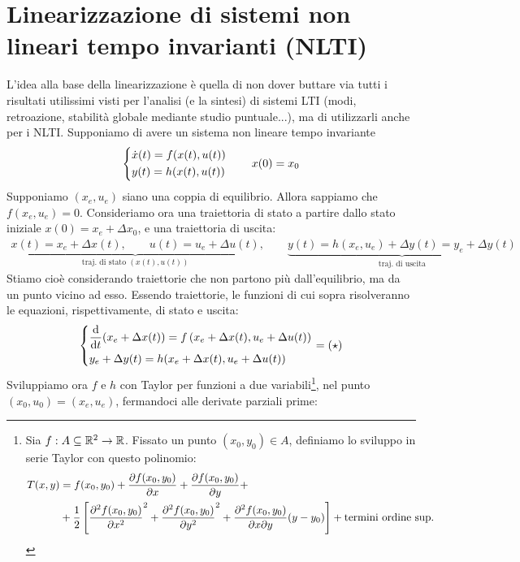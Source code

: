 \documentclass[a4paper]{report}
\begin{document}
\section{Linearizzazione di sistemi non lineari tempo invarianti (NLTI)}
L'idea alla base della linearizzazione è quella di non dover buttare via tutti i risultati utilissimi visti per l'analisi (e la sintesi) di sistemi LTI (modi, retroazione, stabilità globale mediante studio puntuale...), ma di utilizzarli anche per i NLTI.
\bb
	Supponiamo di avere un sistema non lineare tempo invariante$$\begin{dcases}
	\dot x(t) = f(x(t),u(t)) \\
	y(t) = h(x(t), u(t))
\end{dcases}
 \quad \quad x(0) = x_0$$
	Supponiamo $(x_e,u_e)$ siano una coppia di equilibrio. Allora sappiamo che $f(x_e, u_e) = 0$. Consideriamo ora una traiettoria di stato a partire dallo stato iniziale $x(0) = x_e + \Delta x_0$, e una traiettoria di uscita:
\begin{align*}
\underbrace{x(t) = x_e+\Delta x(t), \quad \quad u(t) = u_e+ \Delta u(t)}_{\textrm{traj. di stato } (x(t), u(t))}, \quad  \quad \underbrace{y(t) = h(x_e, u_e) + \Delta y(t) = y_e + \Delta y(t)}_{\textrm{traj. di uscita}}
\end{align*}
Stiamo cioè considerando traiettorie che non partono più dall'equilibrio, ma da un punto vicino ad esso. Essendo traiettorie, le funzioni di cui sopra risolveranno le equazioni, rispettivamente, di stato e uscita:
\begin{align*}
\begin{dcases}
	\dv{t}(x_e + \Delta x(t)) = f\left( x_e+\Delta x(t), u_e + \Delta u(t) \right) \\
	y_e + \Delta y(t) = h(x_e+\Delta x(t), u_e + \Delta u(t))
\end{dcases} = (\star)
\end{align*}
\newpage
Sviluppiamo ora $f$ e $h$ con Taylor per funzioni a due variabili\footnote{Sia $f: A \subseteq \mathbb{R}^2 \rightarrow \mathbb{R}$. Fissato un punto $(x_0, y_0) \in A$, definiamo lo sviluppo in serie Taylor con questo polinomio:
\begin{align*}
	T(x,y) & = f(x_0, y_0) + \pdv{f(x_0, y_0)}{x} (x - x_0)+\pdv{f(x_0, y_0)}{y} (y - y_0) +\\ & + \frac{1}{2} \left[ \pdv[2]{f(x_0, y_0)}{x} (x - x_0)^2 + \pdv[2]{f(x_0, y_0)}{y} (y - y_0)^2 + \pdv{f(x_0, y_0)}{x}{y} (x - x_0)(y-y_0) \right] + \textrm{termini ordine sup.}
\end{align*}
}, nel punto $(x_0, u_0) = (x_e, u_e)$, fermandoci alle derivate parziali prime:
\end{document}
